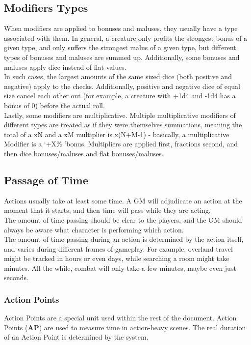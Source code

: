 \subsection{Modifiers Types}\label{subsec:modifiertypes}
When modifiers are applied to bonuses and maluses, they usually have a type associated with them.
In general, a creature only profits the strongest bonus of a given type, and only suffers the strongest malus of a given type, but different types of bonuses and maluses are summed up.
Additionally, some bonuses and maluses apply dice instead of flat values.\\
In such cases, the largest amounts of the same sized dice (both positive and negative) apply to the checks.
Additionally, positive and negative dice of equal size cancel each other out (for example, a creature with +1d4 and -1d4 has a bonus of 0) before the actual roll.\\
Lastly, some modifiers are multiplicative.
Multiple multiplicative modifiers of different types are treated as if they were themselves summations, meaning the total of a xN and a xM multiplier is x(N+M-1) - basically, a multiplicative Modifier is a \lq +X\% \rq bonus.
Multipliers are applied first, fractions second, and then dice bonuses/maluses and flat bonuses/maluses.\\

\subsection{Passage of Time}\label{subsec:passageoftime}
Actions usually take at least some time.
A GM will adjudicate an action at the moment that it starts, and then time will pass while they are acting.\\
The amount of time passing should be clear to the players, and the GM should always be aware what character is performing which action.\\
The amount of time passing during an action is determined by the action itself, and varies during different frames of gameplay.
For example, overland travel might be tracked in hours or even days, while searching a room might take minutes.
All the while, combat will only take a few minutes, maybe even just seconds.

\subsubsection{Action Points}\label{subsubsec:actionpoints}
Action Points are a special unit used within the rest of the document.
Action Points (\textbf{AP}) are used to measure time in action-heavy scenes.
The real duration of an Action Point is determined by the system.